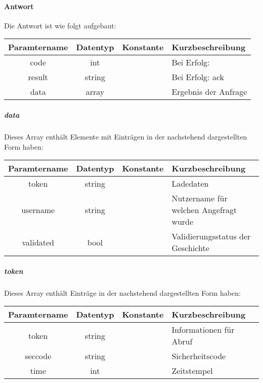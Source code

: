\paragraph{Antwort}Die Antwort ist wie folgt aufgebaut:
\begin{table}[H]
	\begin{tabular}{|c|c|c|p{6.5cm}|}
		\hline
		\textbf{Paramtername} & \textbf{Datentyp} & \textbf{Konstante} & \textbf{Kurzbeschreibung}            \\ \hline                
		code                & int              &                 & Bei Erfolg: {\glqq 0\grqq} \\ \hline
		result              & string           &                 & Bei Erfolg: {\glqq ack\grqq} \\ \hline
		data                & array            &                 & Ergebnis der Anfrage \\ \hline
	\end{tabular}
\end{table}
\subparagraph{data}Dieses Array enthält Elemente mit Einträgen in der nachstehend dargestellten Form haben:
\begin{table}[H]
	\begin{tabular}{|c|c|c|p{6.5cm}|}
		\hline
		\textbf{Paramtername} & \textbf{Datentyp} & \textbf{Konstante} & \textbf{Kurzbeschreibung}    \\ \hline
		token              & string            &                 & Ladedaten \\ \hline
		username           & string            &                 & Nutzername für welchen Angefragt wurde \\ \hline
		validated          & bool              &                 & Validierungsstatus der Geschichte \\ \hline
	\end{tabular}
\end{table}
\subparagraph{token}Dieses Array enthält Einträge in der nachstehend dargestellten Form haben:
\begin{table}[H]
	\begin{tabular}{|c|c|c|p{6.5cm}|}
		\hline
		\textbf{Paramtername} & \textbf{Datentyp} & \textbf{Konstante} & \textbf{Kurzbeschreibung}    \\ \hline
		token              & string            &                 & Informationen für Abruf \\ \hline
		seccode            & string            &                 & Sicherheitscode \\ \hline
		time               & int               &                 & Zeitstempel \\ \hline
	\end{tabular}
\end{table}
